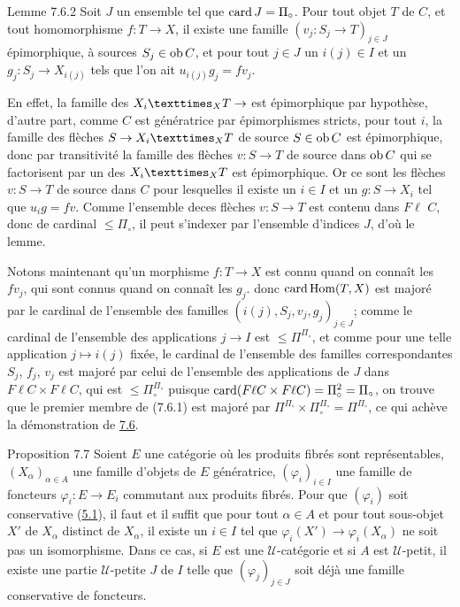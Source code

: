 \documentclass[10pt]{../fichiers-configuration-latex/smfart}
\begin{document}
\begin{enonce*}{Lemme 7.6.2}
Soit $J$ un ensemble tel que $\operatorname{card} J=\Pi_\circ$. Pour tout objet
$T$ de $C$, et tout homomorphisme $f:T\rightarrow X$, il existe une
famille $(v_j:S_j\rightarrow T)_{j\in J}$ épimorphique, à sources
$S_j\in\operatorname{ob} C$, et pour tout $j\in J$ un $i(j)\in I$ et un
$g_j:S_j\rightarrow X_{i(j)}$ tels que l'on ait $u_{i(j)}g_j=fv_j$.
\end{enonce*}

En effet, la famille des $\fprod{X_i}{T}{X}\rightarrow$ est
épimorphique par hypothèse, d'autre part, comme $C$ est
génératrice
par épimorphismes stricts, pour tout $i$, la famille des flèches
$S\rightarrow \fprod{X_i}{T}{X}$ de source $S\in \operatorname{ob} C$ est
épimorphique, donc par transitivité la famille des flèches
$v:S\rightarrow T$ de source dans $\operatorname{ob} C$ qui se factorisent par un
des $\fprod{X_i}{T}{X}$ est épimorphique. Or ce sont les flèches
$v:S\rightarrow T$ de source dans $C$ pour lesquelles il existe un
$i\in I$ et un $g:S\rightarrow X_i$ tel que $u_ig=fv$. Comme
l'ensemble de\pageoriginale ces flèches $v:S\rightarrow T$ est
contenu dans $F\ell$ $C$, donc de cardinal $\leq \Pi_\circ$, il peut
s'indexer par l'ensemble d'indices $J$, d'où le lemme.

Notons maintenant qu'un morphisme $f:T\rightarrow X$ est connu quand
on connaît les $fv_j$, qui sont connus quand on connaît les $g_j$.
donc $\operatorname{card}\operatorname{Hom}(T,X)$ est majoré par le cardinal de l'ensemble des
familles $(i(j),S_j,v_j,g_j)_{j\in J}$; comme le cardinal de
l'ensemble des applications $j\rightarrow I$ est $\leq
\Pi^{\Pi_\circ}$, et comme pour une telle application $j\mapsto
i(j)$ fixée, le cardinal de l'ensemble des familles correspondantes
$S_j$, $f_j$, $v_j$ est majoré par celui de l'ensemble des
applications de $J$ dans $F\ell  C\times F\ell  C$, qui est $\leq
\Pi^{\Pi_\circ}_\circ$ puisque $\operatorname{card}(F\ell C\times F\ell
C)=\Pi_\circ^2=\Pi_\circ$, on trouve que le premier membre de
(7.6.1) est majoré par $\Pi^{\Pi_\circ}\times
\Pi_\circ^{\Pi_\circ}=\Pi^{\Pi_\circ}$, ce qui achève la
démonstration de \hyperref[I.prop7.6]{7.6}.

\begin{enonce*}{Proposition 7.7}
Soient $E$ une catégorie où les produits fibrés sont représentables,
$(X_\alpha)_{\alpha\in A}$ une famille d'objets de $E$ génératrice,
$(\varphi_i)_{i\in I}$ une famille de foncteurs
$\varphi_i:E\rightarrow E_i$ commutant aux produits fibrés. Pour que
$(\varphi_i)$ soit conservative (\hyperref[I.prop5.1]{5.1}), il faut et il
suffit que pour tout $\alpha \in A$ et pour tout sous-objet $X'$ de
$X_\alpha$ distinct de $X_\alpha$, il existe un $i\in I$ tel que
$\varphi_i(X')\rightarrow \varphi_i(X_\alpha)$ ne soit pas un
isomorphisme. Dans ce cas, si $E$ est une $𝒰$-catégorie et
si $A$ est $𝒰$-petit, il existe une partie
$𝒰$-petite $J$ de $I$ telle que $(\varphi_j)_{j\in J}$ soit
déjà une famille conservative de foncteurs.
\end{enonce*}
\end{document}
